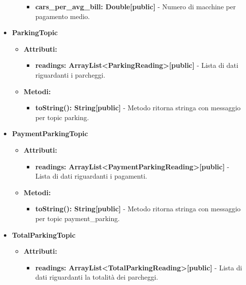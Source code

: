 \documentclass[8pt]{article}
\begin{document}
\begin{itemize}
\begin{itemize}
\begin{itemize}
            \item \textbf{cars\_per\_avg\_bill: Double[public]} - Numero di macchine per pagamento medio.
        \end{itemize}
    \end{itemize}
    \item \textbf{ParkingTopic}
    \begin{itemize}
        \item \textbf{Attributi:}
        \begin{itemize}
            \item \textbf{readings: ArrayList<ParkingReading>[public]} - Lista di dati riguardanti i parcheggi.
        \end{itemize}
    \end{itemize}
    \begin{itemize}
        \item \textbf{Metodi:}
        \begin{itemize}
            \item \textbf{toString(): String[public]} - Metodo ritorna stringa con messaggio per topic parking.
        \end{itemize}
    \end{itemize}
    \item \textbf{PaymentParkingTopic}
    \begin{itemize}
        \item \textbf{Attributi:}
        \begin{itemize}
            \item \textbf{readings: ArrayList<PaymentParkingReading>[public]} - Lista di dati riguardanti i pagamenti.
        \end{itemize}
    \end{itemize}
    \begin{itemize}
        \item \textbf{Metodi:}
        \begin{itemize}
            \item \textbf{toString(): String[public]} - Metodo ritorna stringa con messaggio per topic payment\_parking.
        \end{itemize}
    \end{itemize}
    \item \textbf{TotalParkingTopic}
    \begin{itemize}
        \item \textbf{Attributi:}
        \begin{itemize}
            \item \textbf{readings: ArrayList<TotalParkingReading>[public]} - Lista di dati riguardanti la totalità dei parcheggi.

\end{itemize}
\end{itemize}
\end{itemize}
\end{document}
